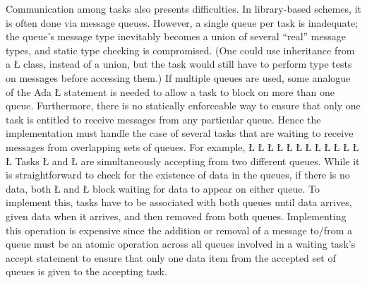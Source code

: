 \documentclass[openright,twoside]{report}
\begin{document}
Communication among tasks also presents difficulties.
In library-based schemes, it is often done via message queues.
However, a single queue per task is inadequate;
the queue's message type inevitably becomes a union of several ``real'' message types, and static type checking is compromised.
(One could use inheritance from a \LGinlinetrue\LGbegin\lgrinde\L{}\endlgrinde\LGend{} class, instead of a union, but the task would still have to perform type tests on messages before accessing them.)
If multiple queues are used, some analogue of the Ada \LGinlinetrue\LGbegin\lgrinde\L{}\endlgrinde\LGend{} statement is needed to allow a task to block on more than one queue.
Furthermore, there is no statically enforceable way to ensure that only one task is entitled to receive messages from any particular queue.
Hence the implementation must handle the case of several tasks that are waiting to receive messages from overlapping sets of queues.
For example,
\LGinlinefalse\LGbegin\lgrinde
\L{}
\L{}
\L{\LB{}}
\CE{}\L{\LB{}}
\CE{}\L{}
\L{\LB{}}
\L{\LB{}}
\L{\LB{}}
\CE{}\L{\LB{}}
\L{\LB{}}
\L{\LB{}}
\L{\LB{\};}}
\L{}
\endlgrinde\LGend
Tasks \LGinlinetrue\LGbegin\lgrinde\L{}\endlgrinde\LGend{} and \LGinlinetrue\LGbegin\lgrinde\L{}\endlgrinde\LGend{} are simultaneously accepting from two different queues.
While it is straightforward to check for the existence of data in the queues, if there is no data, both \LGinlinetrue\LGbegin\lgrinde\L{}\endlgrinde\LGend{} and \LGinlinetrue\LGbegin\lgrinde\L{}\endlgrinde\LGend{} block waiting for data to appear on either queue.
To implement this, tasks have to be associated with both queues until data arrives, given data when it arrives, and then removed from both queues.
Implementing this operation is expensive since the addition or removal of a message to/from a queue must be an atomic operation across all queues involved in a waiting task's accept statement to ensure that only one data item from the accepted set of queues is given to the accepting task.
\end{document}
